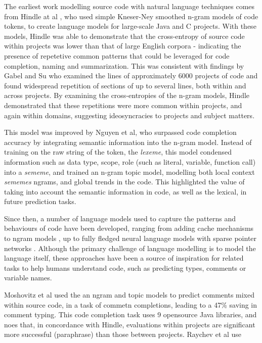 The earliest work modelling source code with natural language techniques comes from Hindle at al \cite{hindle_naturalness_nodate}, who used simple Kneser-Ney smoothed n-gram models of code tokens, to create language models for large-scale Java and C projects.
With these models, Hindle was able to demonstrate that the cross-entropy of source code within projects was lower than that of large English corpora - indicating the presence of repetetive common patterns that could be leveraged for code completion, naming and summarization.
This was consistent with findings by Gabel and Su \cite{gabel_study_2010} who examined the lines of approximately 6000 projects of code and found widespread repetition of sections of up to several lines, both within and across projects.
By examining the cross-entropies of the n-gram models, Hindle demonstrated that these repetitions were more common within projects, and again within domains, suggesting ideosyncracies to projects and subject matters\cite{hindle_naturalness_nodate}.

This model was improved by Nguyen et al\cite{nguyen_statistical_2013}, who surpassed code completion accuracy by integrating semantic information into the n-gram model.
Instead of training on the raw string of the token, the \textit{lexeme}, this model condensed information such as data type, scope, role (such as literal, variable, function call) into a \textit{sememe}, and trained an n-gram topic model, modelling both local context \textit{sememes} ngrams, and global trends in the code.
This highlighted the value of taking into account the semantic information in code, as well as the lexical, in future prediction tasks.

Since then, a number of language models used to capture the patterns and behaviours of code have been developed, ranging from adding cache mechanisms to ngram models \cite{tu_localness_nodate}, up to fully fledged neural language models with sparse pointer networks \cite{bhoopchand_learning_2016}. 
Although the primary challenge of language modelling is to model the language itself, these approaches have been a source of inspiration for related tasks to help humans understand code, such as predicting types, comments or variable names.

Moshovitz et al used the an ngram and topic models to predict comments mixed within source code, in a task of commetn completions, leading to a 47\% saving in comment typing. 
This code completion task uses 9 opensource Java libraries, and noes that, in concordance with Hindle, evaluations within projects are significant more successful (paraphrase) than those between projects.
Raychev et al use 




